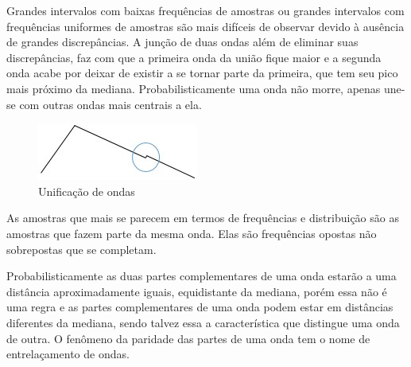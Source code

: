 Grandes intervalos com baixas frequências de amostras ou grandes intervalos com frequências uniformes de amostras são mais difíceis de observar devido à ausência de grandes discrepâncias. A junção de duas ondas além de eliminar suas discrepâncias, faz com que a primeira onda da união fique maior e a segunda onda acabe por deixar de existir a se tornar parte da primeira, que tem seu pico mais próximo da mediana. Probabilisticamente uma onda não morre, apenas une-se com outras ondas mais centrais a ela.
	\begin{figure}[H]
	\caption{Unificação de ondas}
	\label{fig:consciousness_uniform_wave}
	\centering
	\includegraphics[scale=1]{sections/images/consciousness_uniform_wave.jpg}
	\end{figure}

As amostras que mais se parecem em termos de frequências e distribuição são as amostras que fazem parte da mesma onda. Elas são frequências opostas não sobrepostas que se completam.

Probabilisticamente as duas partes complementares de uma onda estarão a uma distância aproximadamente iguais, equidistante da mediana, porém essa não é uma regra e as partes complementares de uma onda podem estar em distâncias diferentes da mediana, sendo talvez essa a característica que distingue uma onda de outra. O fenômeno da paridade das partes de uma onda tem o nome de entrelaçamento de ondas.

